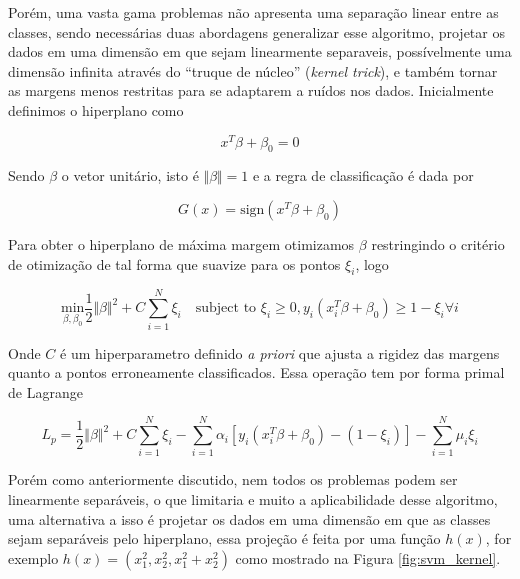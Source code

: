 Porém, uma vasta gama problemas não apresenta uma separação linear entre as
classes, sendo necessárias duas abordagens generalizar esse algoritmo, projetar
os dados em uma dimensão em que sejam linearmente separaveis, possívelmente uma
dimensão infinita através do ``truque de núcleo'' (\textit{kernel trick}), e
também tornar as margens menos restritas para se adaptarem a ruídos nos dados.
Inicialmente definimos o hiperplano como

\begin{equation}
    \label{eq:svm_func}
    x^T\beta + \beta_0 = 0
\end{equation}

Sendo $\beta$ o vetor unitário, isto é $\Vert\beta\Vert = 1$ e a regra de
classificação é dada por

\begin{equation}
    \label{eq:svm_sign}
    G(x) = \text{sign}(x^T\beta + \beta_0)
\end{equation}

Para obter o hiperplano de máxima margem otimizamos $\beta$ restringindo o
critério de otimização de tal forma que suavize para os pontos $\xi_i$, logo

\begin{equation}
    \underset{\beta,\beta_0}{\text{min}} \frac{1}{2}\Vert\beta\Vert^2 +
    C\sum_{i=1}^{N}\xi_i \hspace{1em} \text{subject to } \xi_i \geq 0,
    y_i(x_i^T\beta+\beta_0) \geq 1-\xi_i \forall i
\end{equation}

Onde $C$ é um hiperparametro definido \textit{a priori} que ajusta a rigidez
das margens quanto a pontos erroneamente classificados. Essa operação tem por
forma primal de Lagrange

\begin{equation}
    \label{eq:lag_svm}
    L_p = \frac{1}{2}\Vert\beta\Vert^2 + C\sum_{i=1}^{N}\xi_i -
    \sum_{i=1}^{N}\alpha_i [y_i(x_i^T\beta+\beta_0) - (1-\xi_i)] -
    \sum_{i=1}^{N}\mu_i\xi_i
\end{equation}

Porém como anteriormente discutido, nem todos os problemas podem ser
linearmente separáveis, o que limitaria e muito a aplicabilidade desse
algoritmo, uma alternativa a isso é projetar os dados em uma dimensão em que as
classes sejam separáveis pelo hiperplano, essa projeção é feita por uma função
$h(x)$, for exemplo $h(x) = (x_1^2, x_2^2, x_1^2+x_2^2)$ como mostrado na
Figura \ref{fig:svm_kernel}.

